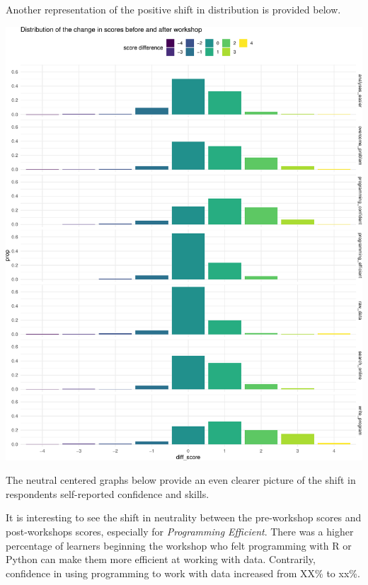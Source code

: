 \documentclass[]{article}
\begin{document}
Another representation of the positive shift in distribution is provided
below.

\includegraphics[width=720]{figures/dc-paired-distribution-shift-1}

The neutral centered graphs below provide an even clearer picture of the
shift in respondents self-reported confidence and skills.

It is interesting to see the shift in neutrality between the
pre-workshop scores and post-workshops scores, especially for
\emph{Programming Efficient}. There was a higher percentage of learners
beginning the workshop who felt programming with R or Python can make
them more efficient at working with data. Contrarily, confidence in
using programming to work with data increased from XX\% to xx\%.
\end{document}
